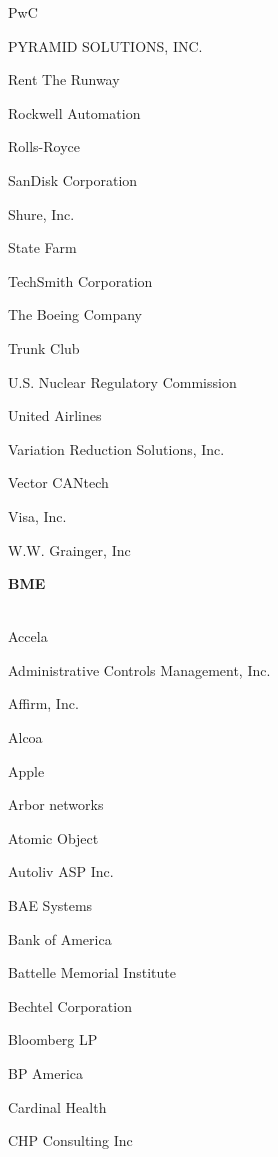 \documentclass[twoside]{article}
\begin{document}
\begin{center}
\begin{multicols}{5}
\begin{FlushLeft}
\begin{compactitem}
\item PwC
\item PYRAMID SOLUTIONS, INC.
\item Rent The Runway
\item Rockwell Automation
\item Rolls-Royce
\item SanDisk Corporation
\item Shure, Inc.
\item State Farm
\item TechSmith Corporation
\item The Boeing Company
\item Trunk Club
\item U.S. Nuclear Regulatory Commission
\item United Airlines
\item Variation Reduction Solutions, Inc.
\item Vector CANtech
\item Visa, Inc.
\item W.W. Grainger, Inc
\end{compactitem}
        \end{FlushLeft}
        \vspace{1em}
        {\fontsize{14}{16}\selectfont \bf BME}\\
        \vspace{-1em}
        ~\hrulefill~
        \vspace{-.9em}
        \begin{FlushLeft}
        \begin{compactitem}
        \item Accela
\item Administrative Controls Management, Inc.
\item Affirm, Inc.
\item Alcoa
\item Apple
\item Arbor networks
\item Atomic Object
\item Autoliv ASP Inc.
\item BAE Systems
\item Bank of America
\item Battelle Memorial Institute
\item Bechtel Corporation
\item Bloomberg LP
\item BP America
\item Cardinal Health
\item CHP Consulting Inc

\end{compactitem}
\end{FlushLeft}
\end{multicols}
\end{center}
\end{document}
